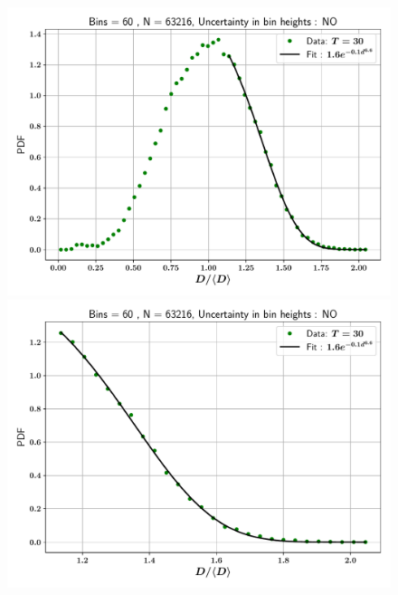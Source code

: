 
\begin{figure}
\centering
\includegraphics{plots/drop_stats/linear_tail_fit_uncertainty_no.pdf} \\
\includegraphics{plots/drop_stats/linear_zoom_tail_fit_uncertainty_no.pdf} \\ 
\caption{\blindtext}
\label{linear_fits_wo}
\end{figure}


